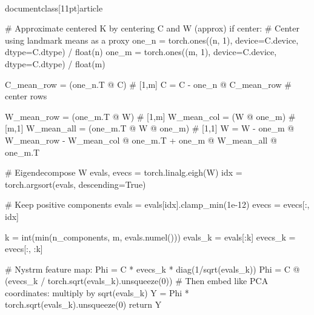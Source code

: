 \\documentclass[11pt]{article}
\begin{document}
\begin{CodeBlock}
    # Approximate centered K by centering C and W (approx)
    if center:
        # Center using landmark means as a proxy
        one_n = torch.ones((n, 1), device=C.device, dtype=C.dtype) / float(n)
        one_m = torch.ones((m, 1), device=C.device, dtype=C.dtype) / float(m)

        C_mean_row = (one_n.T @ C)  # [1,m]
        C = C - one_n @ C_mean_row  # center rows

        W_mean_row = (one_m.T @ W)  # [1,m]
        W_mean_col = (W @ one_m)    # [m,1]
        W_mean_all = (one_m.T @ W @ one_m)  # [1,1]
        W = W - one_m @ W_mean_row - W_mean_col @ one_m.T + one_m @ W_mean_all @ one_m.T

    # Eigendecompose W
    evals, evecs = torch.linalg.eigh(W)
    idx = torch.argsort(evals, descending=True)

    # Keep positive components
    evals = evals[idx].clamp_min(1e-12)
    evecs = evecs[:, idx]

    k = int(min(n_components, m, evals.numel()))
    evals_k = evals[:k]
    evecs_k = evecs[:, :k]

    # Nystrm feature map: Phi = C * evecs_k * diag(1/sqrt(evals_k))
    Phi = C @ (evecs_k / torch.sqrt(evals_k).unsqueeze(0))
    # Then embed like PCA coordinates: multiply by sqrt(evals_k)
    Y = Phi * torch.sqrt(evals_k).unsqueeze(0)
    return Y


\end{CodeBlock}
\end{document}
